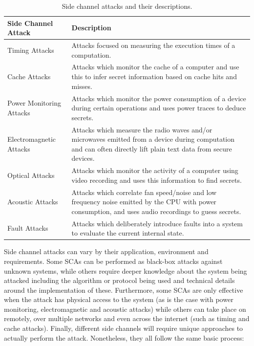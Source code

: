 \documentclass[a4paper,oneside,11pt]{article}
\begin{document}
\begin{table}[h]
	\centering
	\footnotesize

	\begin{tabular}{|l|p{10cm}|}
		\hline
		\textbf{Side Channel Attack} & \textbf{Description} \\
		\hline
		Timing Attacks & Attacks focused on measuring the execution
		times of a computation. \\
		\hline
		Cache Attacks & Attacks which monitor the cache of a computer
		and use this to infer secret information based on cache hits
		and misses. \\
		\hline
		Power Monitoring Attacks & Attacks which monitor the power
		consumption of a device during certain operations and uses
		power traces to deduce secrets. \\
		\hline
		Electromagnetic Attacks & Attacks which measure the radio waves
		and/or microwaves emitted from a device during computation and
		can often directly lift plain text data from secure devices. \\
		\hline
		Optical Attacks & Attacks which monitor the activity of a
		computer using video recording and uses this information to
		find secrets. \\
		\hline
		Acoustic Attacks & Attacks which correlate fan speed/noise and
		low frequency noise emitted by the CPU with power consumption,
		and uses audio recordings to guess secrets. \\
		\hline
		Fault Attacks & Attacks which deliberately introduce faults
		into a system to evaluate the current internal state. \\
		\hline
	\end{tabular}

	\caption{Side channel attacks and their descriptions.}
	\label{tbl:sca-descriptions}
\end{table}

Side channel attacks can vary by their application, environment and
requirements. Some SCAs can be performed as black-box attacks against unknown
systems, while others require deeper knowledge about the system being attacked
including the algorithm or protocol being used and technical details around the
implementation of these. Furthermore, some SCAs are only effective when the
attack has physical access to the system (as is the case with power monitoring,
electromagnetic and acoustic attacks) while others can take place on remotely,
over multiple networks and even across the internet (such as timing and cache
attacks). Finally, different side channels will require unique approaches to
actually perform the attack. Nonetheless, they all follow the same basic
process:
\end{document}
